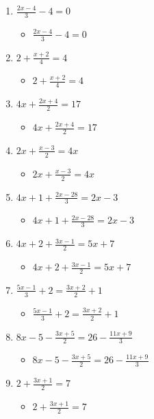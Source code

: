 \documentclass{article}
\begin{document}
\begin{enumerate}
\item {\Large $\frac{2x-4}{3}-4=0$}
  \begin{itemize}
  \item {\Large $\frac{2x-4}{3}-4=0$}
  \end{itemize}
\item {\Large $2+\frac{x+2}{4}=4$}
  \begin{itemize}
  \item {\Large $2+\frac{x+2}{4}=4$}
  \end{itemize}
\item {\Large $4x+\frac{2x+4}{2}=17$}
  \begin{itemize}
  \item {\Large $4x+\frac{2x+4}{2}=17$}
  \end{itemize}
\item {\Large $2x+\frac{x-3}{2}=4x$}
  \begin{itemize}
  \item {\Large $2x+\frac{x-3}{2}=4x$}
  \end{itemize}
\item {\Large $4x+1+\frac{2x-28}{3}=2x-3$}
  \begin{itemize}
  \item {\Large $4x+1+\frac{2x-28}{3}=2x-3$}
  \end{itemize}
\item {\Large $4x+2+\frac{3x-1}{2}=5x+7$}
  \begin{itemize}
  \item {\Large $4x+2+\frac{3x-1}{2}=5x+7$}
  \end{itemize}
\item {\Large $\frac{5x-1}{3}+2=\frac{3x+2}{2}+1$}
  \begin{itemize}
  \item {\Large $\frac{5x-1}{3}+2=\frac{3x+2}{2}+1$}
  \end{itemize}
\item {\Large $8x-5-\frac{3x+5}{2}=26-\frac{11x+9}{3}$}
  \begin{itemize}
  \item {\Large $8x-5-\frac{3x+5}{2}=26-\frac{11x+9}{3}$}
  \end{itemize}
\item {\Large $2+\frac{3x+1}{2}=7$}
  \begin{itemize}
  \item {\Large $2+\frac{3x+1}{2}=7$}
  \end{itemize}

\end{enumerate}
\end{document}
